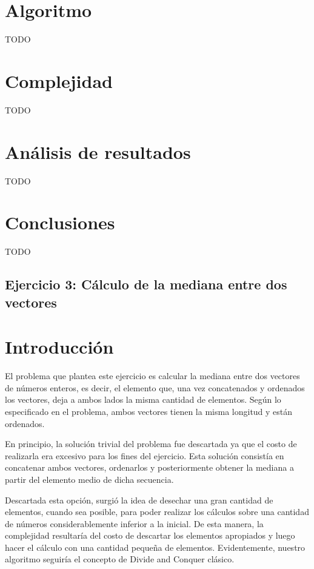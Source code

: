 \documentclass[a4paper,10pt] {article}
\begin{document}
\section*{Algoritmo}

TODO

\section*{Complejidad}

TODO

\section*{An\'alisis de resultados}

TODO

\section*{Conclusiones}

TODO

\begin{center}
\section*{Ejercicio 3: C\'alculo de la mediana entre dos vectores}
\end{center}

\bigskip
\section*{Introducci\'on}

El problema que plantea este ejercicio es calcular la mediana entre dos vectores de n\'umeros enteros, es decir, el elemento que, una vez concatenados y ordenados los vectores, deja a ambos lados la misma cantidad de elementos. Seg\'un lo especificado en el problema, ambos vectores tienen la misma longitud y est\'an ordenados.

En principio, la soluci\'on trivial del problema fue descartada ya que el costo de realizarla era excesivo para los fines del ejercicio. Esta soluci\'on consist\'ia en concatenar ambos vectores, ordenarlos y posteriormente obtener la mediana a partir del elemento medio de dicha secuencia.

Descartada esta opci\'on, surgi\'o la idea de desechar una gran cantidad de elementos, cuando sea posible, para poder realizar los c\'alculos sobre una cantidad de n\'umeros considerablemente inferior a la inicial. De esta manera, la complejidad resultar\'ia del costo de descartar los elementos apropiados y luego hacer el c\'alculo con una cantidad peque\~{n}a de elementos. Evidentemente, nuestro algoritmo seguir\'ia el concepto de Divide and Conquer cl\'asico.
\end{document}
